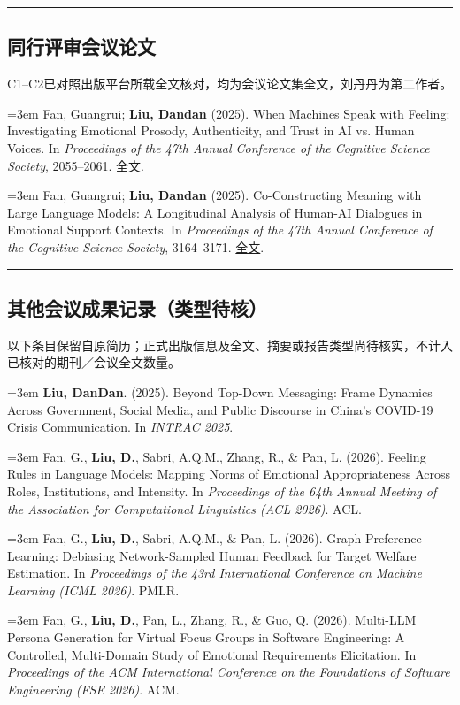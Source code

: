 \documentclass[a4paper,11pt]{article}
\newcommand{\hsep}{\noindent\textcolor{teal}{\rule{\textwidth}{0.5pt}}}
\newcommand{\block}[1]{\par\addvspace{7pt}\Needspace{5\baselineskip}\hsep\vspace{-8pt}\subsection*{#1}}
\newcommand{\publication}[2]{%
  \par\addvspace{8pt}\noindent
  \begin{minipage}{\linewidth}
    \linespread{1.06}\fontsize{10.8}{13.4}\selectfont\raggedright
    \hangindent=3em\hangafter=1
    \makebox[3em][l]{\textcolor{teal}{[#1]}}#2
  \end{minipage}\par}
\begin{document}
\block{同行评审会议论文}
{\small C1--C2已对照出版平台所载全文核对，均为会议论文集全文，刘丹丹为第二作者。}\par
\publication{C1}{Fan, Guangrui; \textbf{Liu, Dandan} (2025). When Machines Speak with Feeling: Investigating Emotional Prosody, Authenticity, and Trust in AI vs. Human Voices. In \emph{Proceedings of the 47th Annual Conference of the Cognitive Science Society}, 2055--2061. \href{https://escholarship.org/uc/item/8vr8s6h8}{全文}.}

\publication{C2}{Fan, Guangrui; \textbf{Liu, Dandan} (2025). Co-Constructing Meaning with Large Language Models: A Longitudinal Analysis of Human-AI Dialogues in Emotional Support Contexts. In \emph{Proceedings of the 47th Annual Conference of the Cognitive Science Society}, 3164--3171. \href{https://escholarship.org/uc/item/4dn5q26f}{全文}.}


\block{其他会议成果记录（类型待核）}
{\small 以下条目保留自原简历；正式出版信息及全文、摘要或报告类型尚待核实，不计入已核对的期刊／会议全文数量。}\par
\publication{R1}{\textbf{Liu, DanDan}. (2025). Beyond Top-Down Messaging: Frame Dynamics Across Government, Social Media, and Public Discourse in China's COVID-19 Crisis Communication. In \emph{INTRAC 2025}.}

\publication{R2}{Fan, G., \textbf{Liu, D.}, Sabri, A.Q.M., Zhang, R., \& Pan, L. (2026). Feeling Rules in Language Models: Mapping Norms of Emotional Appropriateness Across Roles, Institutions, and Intensity. In \emph{Proceedings of the 64th Annual Meeting of the Association for Computational Linguistics (ACL 2026)}. ACL.}

\publication{R3}{Fan, G., \textbf{Liu, D.}, Sabri, A.Q.M., \& Pan, L. (2026). Graph-Preference Learning: Debiasing Network-Sampled Human Feedback for Target Welfare Estimation. In \emph{Proceedings of the 43rd International Conference on Machine Learning (ICML 2026)}. PMLR.}

\publication{R4}{Fan, G., \textbf{Liu, D.}, Pan, L., Zhang, R., \& Guo, Q. (2026). Multi-LLM Persona Generation for Virtual Focus Groups in Software Engineering: A Controlled, Multi-Domain Study of Emotional Requirements Elicitation. In \emph{Proceedings of the ACM International Conference on the Foundations of Software Engineering (FSE 2026)}. ACM.}
\end{document}
